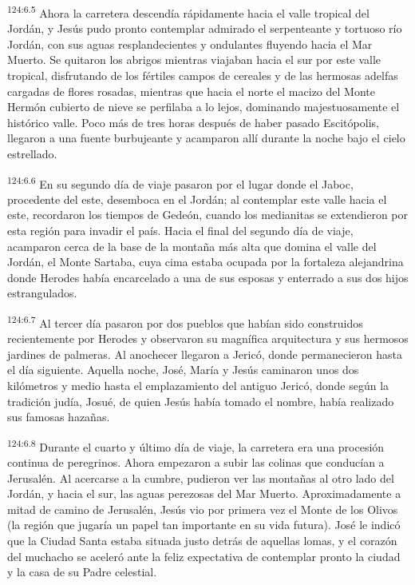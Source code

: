 \par
\textsuperscript{124:6.5} Ahora la carretera descendía rápidamente hacia el valle tropical del Jordán, y Jesús pudo pronto contemplar admirado el serpenteante y tortuoso río Jordán, con sus aguas resplandecientes y ondulantes fluyendo hacia el Mar Muerto. Se quitaron los abrigos mientras viajaban hacia el sur por este valle tropical, disfrutando de los fértiles campos de cereales y de las hermosas adelfas cargadas de flores rosadas, mientras que hacia el norte el macizo del Monte Hermón cubierto de nieve se perfilaba a lo lejos, dominando majestuosamente el histórico valle. Poco más de tres horas después de haber pasado Escitópolis, llegaron a una fuente burbujeante y acamparon allí durante la noche bajo el cielo estrellado.

\par
\textsuperscript{124:6.6} En su segundo día de viaje pasaron por el lugar donde el Jaboc, procedente del este, desemboca en el Jordán; al contemplar este valle hacia el este, recordaron los tiempos de Gedeón, cuando los medianitas se extendieron por esta región para invadir el país. Hacia el final del segundo día de viaje, acamparon cerca de la base de la montaña más alta que domina el valle del Jordán, el Monte Sartaba, cuya cima estaba ocupada por la fortaleza alejandrina donde Herodes había encarcelado a una de sus esposas y enterrado a sus dos hijos estrangulados.

\par
\textsuperscript{124:6.7} Al tercer día pasaron por dos pueblos que habían sido construidos recientemente por Herodes y observaron su magnífica arquitectura y sus hermosos jardines de palmeras. Al anochecer llegaron a Jericó, donde permanecieron hasta el día siguiente. Aquella noche, José, María y Jesús caminaron unos dos kilómetros y medio hasta el emplazamiento del antiguo Jericó, donde según la tradición judía, Josué, de quien Jesús había tomado el nombre, había realizado sus famosas hazañas.

\par
\textsuperscript{124:6.8} Durante el cuarto y último día de viaje, la carretera era una procesión continua de peregrinos. Ahora empezaron a subir las colinas que conducían a Jerusalén. Al acercarse a la cumbre, pudieron ver las montañas al otro lado del Jordán, y hacia el sur, las aguas perezosas del Mar Muerto. Aproximadamente a mitad de camino de Jerusalén, Jesús vio por primera vez el Monte de los Olivos (la región que jugaría un papel tan importante en su vida futura). José le indicó que la Ciudad Santa estaba situada justo detrás de aquellas lomas, y el corazón del muchacho se aceleró ante la feliz expectativa de contemplar pronto la ciudad y la casa de su Padre celestial.

